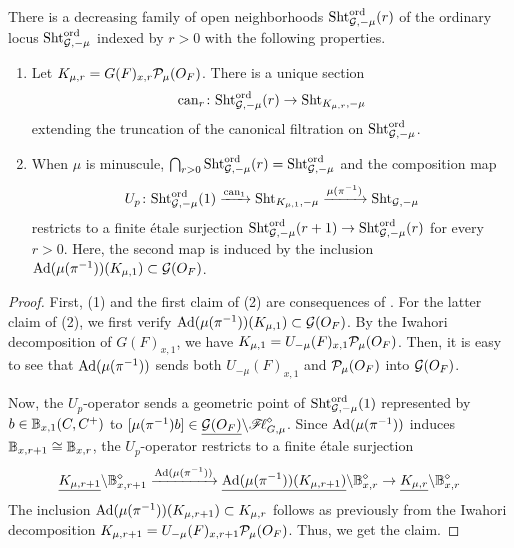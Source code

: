 \documentclass[12pt,reqno]{amsart}
\begin{document}
\begin{thm} \label{thm:canonical_filtration}
    There is a decreasing family of open neighborhoods ${\operatorname{Sht}}_{{\mathcal{G}}, -\mu}^{{\operatorname{ord}}}(r)$ of the ordinary locus ${\operatorname{Sht}}_{{\mathcal{G}}, -\mu}^{\operatorname{ord}}$ indexed by $r > 0$ with the following properties. 
    \begin{enumerate}
        \item Let $K_{\mu, r} = G(F)_{x, r} {\mathcal{P}}_\mu(O_F)$. There is a unique section
        \[
            {\operatorname{can}}_r \colon {\operatorname{Sht}}^{{\operatorname{ord}}}_{{\mathcal{G}}, -\mu}(r) \to {\operatorname{Sht}}_{K_{\mu, r}, -\mu}
        \]
        extending the truncation of the canonical filtration on ${\operatorname{Sht}}^{\operatorname{ord}}_{{\mathcal{G}}, -\mu}$. 
        \item When $\mu$ is minuscule, $\bigcap_{r > 0} {\operatorname{Sht}}_{{\mathcal{G}}, -\mu}^{\operatorname{ord}}(r) = {\operatorname{Sht}}^{{\operatorname{ord}}}_{{\mathcal{G}}, -\mu}$ and the composition map
        \[
            U_p \colon {\operatorname{Sht}}^{{\operatorname{ord}}}_{{\mathcal{G}}, -\mu}(1) \xrightarrow{{\operatorname{can}}_1} {\operatorname{Sht}}_{K_{\mu, 1}, -\mu} \xrightarrow{\mu(\pi^{-1})} {\operatorname{Sht}}_{{\mathcal{G}}, -\mu}
        \]
        restricts to a finite \'{e}tale surjection ${\operatorname{Sht}}_{{\mathcal{G}}, -\mu}^{\operatorname{ord}}(r+1) \to {\operatorname{Sht}}_{{\mathcal{G}}, -\mu}^{\operatorname{ord}}(r)$ for every $r > 0$. Here, the second map is induced by the inclusion ${\operatorname{Ad}}(\mu(\pi^{-1}))(K_{\mu, 1}) \subset {\mathcal{G}}(O_F)$. 
    \end{enumerate}
\end{thm}
\begin{proof}
    First, (1) and the first claim of (2) are consequences of . For the latter claim of (2), we first verify ${\operatorname{Ad}}(\mu(\pi^{-1}))(K_{\mu, 1}) \subset {\mathcal{G}}(O_F)$. By the Iwahori decomposition of $G(F)_{x, 1}$, we have $K_{\mu, 1} = U_{-\mu}(F)_{x, 1} {\mathcal{P}}_\mu(O_F)$. Then, it is easy to see that ${\operatorname{Ad}}(\mu(\pi^{-1}))$ sends both $U_{-\mu}(F)_{x, 1}$ and ${\mathcal{P}}_\mu(O_F)$ into ${\mathcal{G}}(O_F)$. 
    
    Now, the $U_p$-operator sends a geometric point of ${\operatorname{Sht}}_{{\mathcal{G}}, - \mu}^{{\operatorname{ord}}}(1)$ represented by $b \in \mathbb{B}_{x,1}(C, C^+)$ to $[\mu(\pi^{-1})b] \in {\underline{{\mathcal{G}}(O_F)}} \backslash {\mathscr{F}\!\ell}_{G, \mu}^\diamond$. Since ${\operatorname{Ad}}(\mu(\pi^{-1}))$ induces $\mathbb{B}_{x, r+1} \cong  \mathbb{B}_{x, r}$, the $U_p$-operator restricts to a finite \'{e}tale surjection
    \[
        {\underline{K_{\mu, r+1}}} \backslash \mathbb{B}_{x, r+1}^\diamond \xrightarrow{{\operatorname{Ad}}(\mu(\pi^{-1}))} {\underline{{\operatorname{Ad}}(\mu(\pi^{-1}))(K_{\mu, r+1})}} \backslash \mathbb{B}_{x, r}^\diamond \to {\underline{K_{\mu, r}}} \backslash \mathbb{B}_{x, r}^\diamond
    \]
    The inclusion ${\operatorname{Ad}}(\mu(\pi^{-1}))(K_{\mu, r+1}) \subset K_{\mu, r}$ follows as previously from the Iwahori decomposition $K_{\mu, r+1} = U_{-\mu}(F)_{x, r+1} {\mathcal{P}}_\mu(O_F)$. Thus, we get the claim. 
\end{proof}
\end{document}
